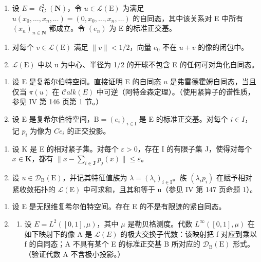 \exercisesection{}

\begin{enumerate}
\def\labelenumi{\arabic{enumi})}
\tightlist
\item
  设 \(E = \ell_{\mathbf{C}}^{2}(\mathbf{N})\)，令 \(u \in \mathcal{L}(\mathrm{E})\) 为满足 \(u(x_{0}, \ldots, x_{n}, \ldots) = (0, x_{0}, \ldots, x_{n}, \ldots)\) 的自同态，其中该关系对 E 中所有 \((x_{n})_{n \in \mathbf{N}}\) 都成立。令 \((e_{n})\) 为 E 的标准正交基。
\end{enumerate}

\begin{enumerate}
\def\labelenumi{\alph{enumi})}
\item
  对每个 \(v \in \mathcal{L}(\mathrm{E})\) 满足 \(\|v\| < 1/2\)，向量 \(e_{0}\) 不在 \(u + v\) 的像的闭包中。
\item
  \(\mathcal{L}(\mathrm{E})\) 中以 u 为中心、半径为 1/2 的开球不包含 E 的任何可对角化自同态。
\end{enumerate}

\begin{enumerate}
\def\labelenumi{\arabic{enumi})}
\setcounter{enumi}{1}
\item
  设 E 是复希尔伯特空间。直接证明 E 的自同态 \(u\) 是弗雷德霍姆自同态，当且仅当 \(\pi(u)\) 在 \(\mathcal{C}alk(E)\) 中可逆（阿特金森定理）。（使用紧算子的谱性质，参见 IV 第 146 页第 1 节。）
\item
  设 E 是复希尔伯特空间，\(\mathrm{B}=(e_{i})_{i\in\mathrm{I}}\) 是 E 的标准正交基。对每个 \(i\in I\)，记 \(p_{i}\) 为像为 \(Ce_{i}\) 的正交投影。
\end{enumerate}

\begin{enumerate}
\def\labelenumi{\alph{enumi})}
\item
  设 K 是 E 的相对紧子集。对每个 \(\varepsilon > 0\)，存在 I 的有限子集 J，使得对每个 \(x \in \mathbf{K}\)，都有 \(\|x - \sum_{i \in \mathbf{J}} p_j(x)\| \leqslant \varepsilon\)。
\item
  设 \(u \in \mathcal{D}_{\mathrm{B}}(\mathrm{E})\)，并记其特征值族为 \(\lambda = (\lambda_{i})_{i \in \mathrm{I}}\)。族 \((\lambda_{i} p_{i})\) 在赋予相对紧收敛拓扑的 \(\mathcal{L}(\mathrm{E})\) 中可求和，且其和等于 u（参见 IV 第 147 页命题 1）。
\end{enumerate}

\begin{enumerate}
\def\labelenumi{\arabic{enumi})}
\setcounter{enumi}{3}
\item
  设 E 是无限维复希尔伯特空间。存在 E 的不是有限迹的紧自同态。
\item
  \begin{enumerate}
  \def\labelenumii{\alph{enumii})}
  \tightlist
  \item
  设 \(E = L^{2}([0,1], \mu)\)，其中 \(\mu\) 是勒贝格测度。代数 \(L^{\infty}([0,1], \mu)\) 在如下映射下的像 A 是 \(\mathcal{L}(E)\) 的极大交换子代数：该映射把 f 对应到乘以 f 的自同态；A 不具有某个 E 的标准正交基 B 所对应的 \(\mathcal{D}_{\mathrm{B}}(\mathrm{E})\) 形式。（验证代数 A 不含极小投影。）
  \end{enumerate}
\end{enumerate}

